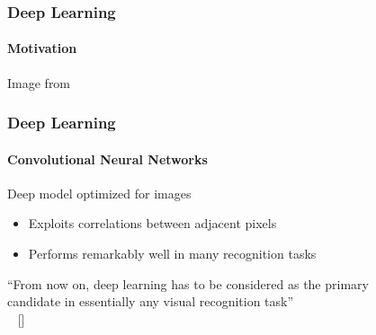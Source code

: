 \documentclass[xetex,professionalfont]{beamer}
\begin{document}
\begin{frame}
\frametitle{Deep Learning}
\framesubtitle{Motivation}

\begin{center}
    {\centering Image from \cite{bengio2015}}
\end{center}

\end{frame}


\begin{frame}
\frametitle{Deep Learning}
\framesubtitle{Convolutional Neural Networks}

Deep model optimized for images
\begin{itemize}
    \item Exploits correlations between adjacent pixels
    \item Performs remarkably well in many recognition tasks
\end{itemize}

\bigskip
\begin{center}
    \enquote{From now on, deep learning has to be considered as the primary\\ candidate in essentially any visual recognition task}\\
    ~ [\cite{razavian14}] %
\end{center}

\end{frame}

\end{document}
